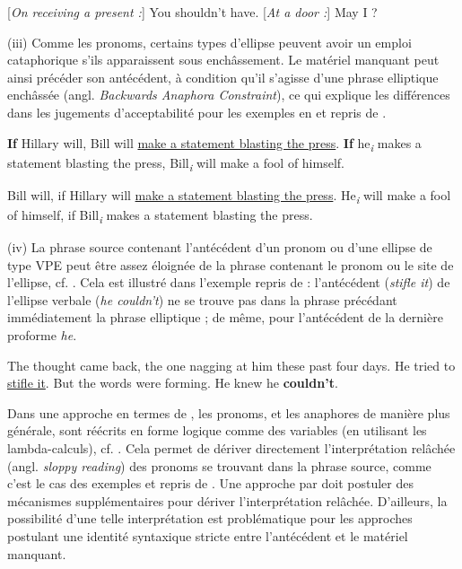   \ea \label{ch1:ex117}
  \ea{} [\textit{On receiving a present :}] You shouldn’t have.
  \ex{} [\textit{At a door :}] May I ?  
  \z
  \z

(iii) Comme les pronoms, certains types d’ellipse peuvent avoir un emploi cataphorique s’ils apparaissent sous enchâssement. Le matériel manquant peut ainsi précéder son antécédent, à condition qu’il s’agisse d’une phrase elliptique enchâssée (angl. \textit{Backwards Anaphora Constraint}), ce qui explique les différences dans les jugements d’acceptabilité pour les exemples en  et  repris de \citet{Kehler2000}. 

  \ea \label{ch1:ex118}
  \ea  \textbf{If} Hillary will, Bill will \uline{make a statement blasting the press}. 
  \ex  \textbf{If} he\textit{\textsubscript{i}} makes a statement blasting the press, Bill\textit{\textsubscript{i}} will make a fool of himself.  
  \z
  \z

  \ea \label{ch1:ex119}
  \ea  *Bill will, if Hillary will \uline{make a statement blasting the press}. 
  \ex  *He\textit{\textsubscript{i}} will make a fool of himself, if Bill\textit{\textsubscript{i}} makes a statement blasting the press.  
  \z
  \z

(iv) La phrase source contenant l’antécédent d’un pronom ou d’une ellipse de type VPE peut être assez éloignée de la phrase contenant le pronom ou le site de l’ellipse, cf. \citet{Hardt1993}. Cela est illustré dans l’exemple  repris de \citet{Kehler2000} : l’antécédent (\textit{stifle it}) de l’ellipse verbale (\textit{he couldn’t}) ne se trouve pas dans la phrase précédant immédiatement la phrase elliptique ; de même, pour l’antécédent de la dernière proforme \textit{he}.

    \ea \label{ch1:ex120}
    The thought came back, the one nagging at him these past four days. He tried to \uline{stifle it}. But the words were forming. He knew he \textbf{couldn’t}.   
    \z

Dans une approche en termes de , les pronoms, et les anaphores de manière plus générale, sont réécrits en forme logique comme des variables (en utilisant les lambda-calculs), cf. \citet{Williams1977}. Cela permet de dériver directement l’interprétation relâchée (angl. \textit{sloppy reading}) des pronoms se trouvant dans la phrase source, comme c’est le cas des exemples  et  repris de \citet{Winkler2006}. Une approche par  doit postuler des mécanismes supplémentaires pour dériver l’interprétation relâchée. D’ailleurs, la possibilité d’une telle interprétation est problématique pour les approches postulant une identité syntaxique stricte entre l’antécédent et le matériel manquant.


